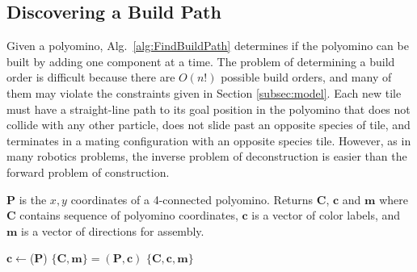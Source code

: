 




\subsection{Discovering a Build Path}

Given a polyomino, Alg.~\ref{alg:FindBuildPath} determines if the polyomino can be built by adding one component at a time.
 The  problem of determining a build order is difficult because there are $O(n!)$ possible build orders, and many of them may  violate the constraints given in Section \ref{subsec:model}.  
 Each new tile must have a straight-line path to its goal position in the polyomino that does not collide with any other particle, does not slide past an opposite species of tile, and terminates in a mating configuration with an opposite species tile.
However, as in many robotics problems, the inverse problem of deconstruction is easier than the forward problem of construction.  

\begin{algorithm}
\newcommand\algotext[1]{\end{algorithmic}#1\begin{algorithmic}[1]}
\caption{($\mathbf{P})$   \label{alg:FindBuildPath}}
$\mathbf{P}$ is the $x,y$ coordinates of a 4-connected polyomino. %
Returns $ \mathbf{C} $, $ \mathbf{c} $ and $\mathbf{m}$ where $ \mathbf{C} $ contains sequence of polyomino coordinates, $ \mathbf{c} $ is a vector of color labels, and $\mathbf{m}$ is a vector of directions for assembly.
\begin{algorithmic}[1]

\State\hbox{$ \mathbf{c}\leftarrow${}($\mathbf{P}$)}
\State $\{\mathbf{C},\mathbf{m} \}= ${}$(\mathbf{P},\mathbf{c})$
\State \Return $\{ \mathbf{C},\mathbf{c}, \mathbf{m} \} $ 
\end{algorithmic}
\end{algorithm} 

